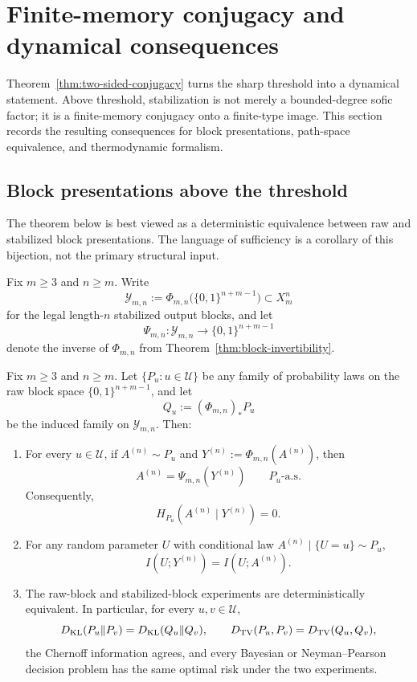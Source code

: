 \section{Finite-memory conjugacy and dynamical consequences}\label{sec:measurement}

Theorem~\ref{thm:two-sided-conjugacy} turns the sharp threshold into a dynamical statement. Above threshold, stabilization is not merely a bounded-degree sofic factor; it is a finite-memory conjugacy onto a finite-type image. This section records the resulting consequences for block presentations, path-space equivalence, and thermodynamic formalism.

\subsection{Block presentations above the threshold}\label{sec:measurement:sufficiency}

The theorem below is best viewed as a deterministic equivalence between raw and stabilized block presentations. The language of sufficiency is a corollary of this bijection, not the primary structural input.

Fix $m\ge 3$ and $n\ge m$. Write
\[
\mathcal Y_{m,n}:=\Phi_{m,n}\bigl(\{0,1\}^{n+m-1}\bigr)\subset X_m^n
\]
for the legal length-$n$ stabilized output blocks, and let
\[
\Psi_{m,n}:\mathcal Y_{m,n}\to\{0,1\}^{n+m-1}
\]
denote the inverse of $\Phi_{m,n}$ from Theorem~\ref{thm:block-invertibility}.

\begin{theorem}\label{thm:exact-sufficiency}
Fix $m\ge 3$ and $n\ge m$. Let $\{P_u:u\in\mathcal U\}$ be any family of probability laws on the raw block space $\{0,1\}^{n+m-1}$, and let
\[
Q_u:=(\Phi_{m,n})_*P_u
\]
be the induced family on $\mathcal Y_{m,n}$. Then:
\begin{enumerate}[label=(\roman*),leftmargin=*,itemsep=2pt]
  \item For every $u\in\mathcal U$, if $A^{(n)}\sim P_u$ and $Y^{(n)}:=\Phi_{m,n}(A^{(n)})$, then
  \[
  A^{(n)}=\Psi_{m,n}(Y^{(n)})\qquad P_u\text{-a.s.}
  \]
  Consequently,
  \[
  H_{P_u}(A^{(n)}\mid Y^{(n)})=0.
  \]
  \item For any random parameter $U$ with conditional law $A^{(n)}\mid\{U=u\}\sim P_u$,
  \[
  I(U;Y^{(n)})=I(U;A^{(n)}).
  \]
  \item The raw-block and stabilized-block experiments are deterministically equivalent. In particular, for every $u,v\in\mathcal U$,
  \[
  D_{\mathrm{KL}}(P_u\|P_v)=D_{\mathrm{KL}}(Q_u\|Q_v),
  \qquad
  D_{\mathrm{TV}}(P_u,P_v)=D_{\mathrm{TV}}(Q_u,Q_v),
  \]
  the Chernoff information agrees, and every Bayesian or Neyman--Pearson decision problem has the same optimal risk under the two experiments.
\end{enumerate}
\end{theorem}

